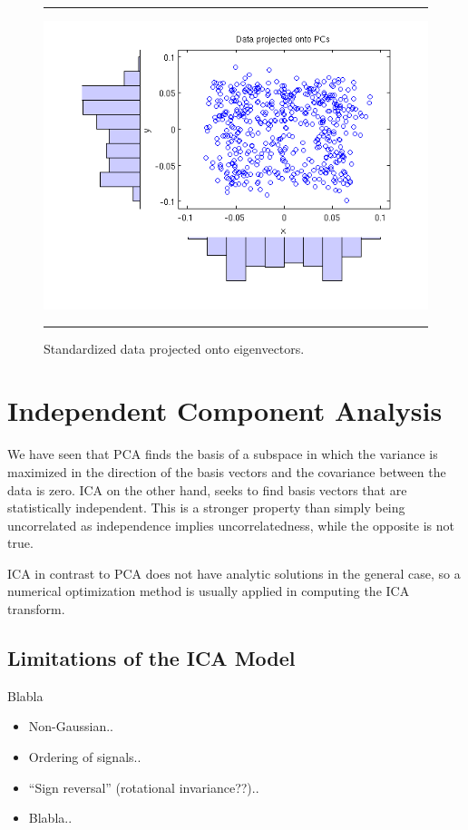 \documentclass[11pt, oneside, a4paper]{report}
\begin{document}
\begin{figure}
  \centering
  \hrule
  \includegraphics[width = .9\textwidth]{Figures/pca_eig_projection}
  \hrule
  \caption{Standardized data projected onto eigenvectors.}
\end{figure}

\chapter{Independent Component Analysis}

We have seen that PCA finds the basis of a subspace in which the variance is
maximized in the direction of the basis vectors and the covariance
between the data is zero. ICA on the other hand, seeks to find basis
vectors that are statistically independent. This is a stronger
property than simply being uncorrelated as independence implies
uncorrelatedness, while the opposite is not true. 

ICA in contrast to PCA does not have analytic solutions in the general case, 
so a numerical optimization method is usually applied in computing the ICA transform.

\section{Limitations of the ICA Model}\label{ICA_restrictions}

Blabla


\begin{itemize}
  \item Non-Gaussian..
  \item Ordering of signals..
  \item ``Sign reversal'' (rotational invariance??)..
  \item Blabla..
\end{itemize}
\end{document}
